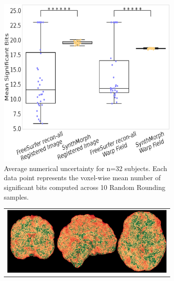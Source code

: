 \begin{figure}[t]
  \centering
  \begin{subfigure}[b]{0.48\linewidth}
    \hspace*{-1cm}                                                           
    \includegraphics[width=1.25\linewidth]{figures3/fs_sm_boxplot.eps}
    \caption{Average numerical uncertainty for n=32 subjects. Each data point represents the voxel-wise mean number of significant bits computed across 10 Random Rounding samples.} 
    \label{sm_boxplot}
  \end{subfigure}
  \hfill
  \hfill
  \begin{subfigure}[b]{0.48\linewidth}
    \centering
  \begin{tabular}{c}
        \includegraphics[width=\linewidth]{figures3/special_fig/fs_sub-0025555_sigmap.eps} \\

\end{tabular}
\end{subfigure}
\end{figure}
